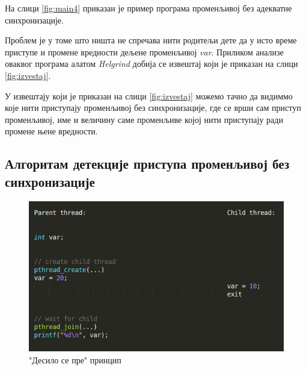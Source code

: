 \documentclass[12pt,oneside]{memoir}
\begin{document}
\indent На слици \ref{fig:main4} приказан је пример програма променљивој без адекватне синхронизације.

\indent Проблем је у томе што ништа не спречава нити родитељи дете да у исто време приступе и промене вредности дељене променљивој \textit{var}. Приликом анализе оваквог програма алатом \textit{Helgrind} добија се извештај који је приказан на слици \ref{fig:izvestaj}.

\indent У извештају који је приказан на слици \ref{fig:izvestaj} можемо тачно да видиммо које нити приступају променљивој без синхронизације, где се врши сам приступ променљивој, име и величину саме променљиве којој нити приступају ради промене њене вредности.


\subsection{Алгоритам детекције приступа променљивој без синхронизације}

\begin{figure}[h!]
\begin{center}
\includegraphics[scale=0.75]{slika16.png}
\end{center}
\caption{"Десило се пре" принцип}
\label{fig:dspPrincip}
\end{figure}
\end{document}
